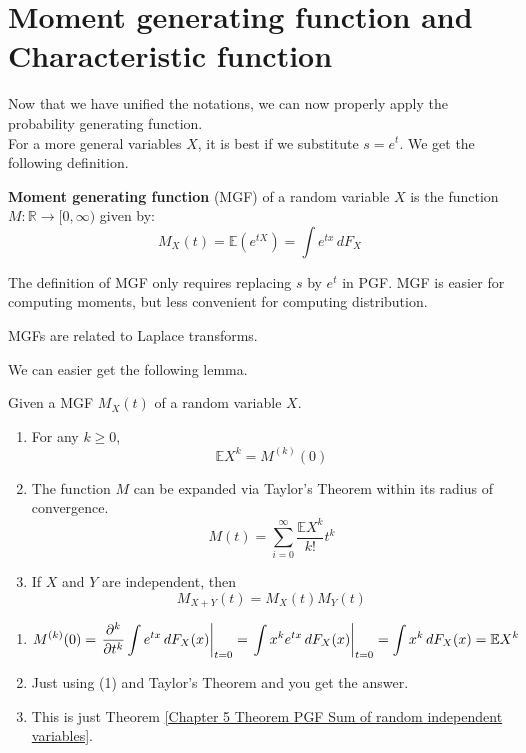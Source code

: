 \documentclass{huhtakm-template-book}
\newcommand{\expect}{\mathbb{E}}
\begin{document}
\section{Moment generating function and Characteristic function}
Now that we have unified the notations, we can now properly apply the probability generating function.\\
For a more general variables $X$, it is best if we substitute $s=e^{t}$. We get the following definition.
\begin{defn}
    \textbf{Moment generating function} (MGF) of a random variable $X$ is the function $M:\mathbb{R}\to[0,\infty)$ given by:
    \begin{equation*}
        M_{X}(t)=\expect(e^{tX})=\int e^{tx}\,dF_{X}
    \end{equation*}
\end{defn}
\begin{rem}
    The definition of MGF only requires replacing $s$ by $e^{t}$ in PGF. MGF is easier for computing moments, but less convenient for computing distribution.
\end{rem}
\begin{rem}
    MGFs are related to Laplace transforms.
\end{rem}
We can easier get the following lemma.
\begin{lem}
    Given a MGF $M_{X}(t)$ of a random variable $X$. 
    \begin{enumerate}
        \item For any $k\geq 0$,
        \begin{equation*}
            \expect X^{k}=M^{(k)}(0)
        \end{equation*}
        \item The function $M$ can be expanded via Taylor's Theorem within its radius of convergence.
        \begin{equation*}
            M(t)=\sum_{i=0}^{\infty}\frac{\expect X^{k}}{k!}t^{k}
        \end{equation*}
        \item If $X$ and $Y$ are independent, then
        \begin{equation*}
            M_{X+Y}(t)=M_{X}(t)M_{Y}(t)
        \end{equation*}
    \end{enumerate}
\end{lem}
\begin{proofing}
    \begin{enumerate}
        \item 
        \begin{equation*}
            M^{(k)}(0)=\left.\pdv*[order={k}]{\int e^{tx}\,dF_{X}(x)}{t}\right|_{t=0}=\left.\int x^{k}e^{tx}\,dF_{X}(x)\right|_{t=0}=\int x^{k}\,dF_{X}(x)=\expect X^{k}
        \end{equation*}
        \item Just using (1) and Taylor's Theorem and you get the answer.
        \item This is just Theorem \ref{Chapter 5 Theorem PGF Sum of random independent variables}.
    \end{enumerate}
\end{proofing}
\end{document}
